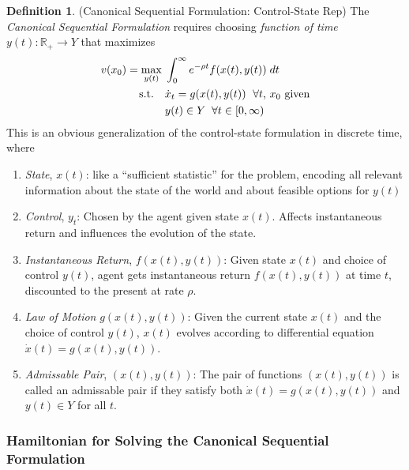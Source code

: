 \documentclass[12pt]{book}
\numberwithin{equation}{section} %
\theoremstyle{plain}
\theoremstyle{definition}
\newtheorem{defn}[thm]{Definition}
\theoremstyle{remark}
\newcommand{\ra}{\rightarrow}
\newcommand{\R}{\mathbb{R}}
\begin{document}
\begin{defn}{(Canonical Sequential Formulation: Control-State Rep)}
\label{defn:sequential-altrep-cts}
The \emph{Canonical Sequential Formulation} requires choosing
\emph{function of time} $y(t):\R_+\ra Y$ that maximizes
\begin{align}
  \label{prob:cts-dynamic}
  v(x_0)
  =
  \max_{y(t)}\;
  &\int_0^\infty e^{-\rho t} f(x(t),y(t)) \; dt
  \notag\\
  \text{s.t.}\quad
  &\text{$\dot{x}_{t} = g(x(t),y(t))$ $\;\forall t$, $x_0$ given}
  \notag\\
  &
  y(t) \in Y \;\; \forall t\in[0,\infty)
\end{align}
This is an obvious generalization of the control-state formulation in
discrete time, where
\begin{enumerate}
  \item \emph{State}, $x(t)$:
    like a ``sufficient statistic'' for the problem, encoding all
    relevant information about the state of the world and about feasible
    options for $y(t)$

  \item \emph{Control}, $y_{t}$: Chosen by the agent given state $x(t)$.
    Affects instantaneous return and influences the evolution of the
    state.

  \item \emph{Instantaneous Return}, $f(x(t),y(t))$: Given state $x(t)$ and
    choice of control $y(t)$, agent gets instantaneous return
    $f(x(t),y(t))$ at time $t$, discounted to the present at rate
    $\rho$.

  \item \emph{Law of Motion} $g(x(t),y(t))$: Given the current state $x(t)$
    and the choice of control $y(t)$,
    $x(t)$ evolves according to differential equation
    $\dot{x}(t)=g(x(t),y(t))$.
  \item \emph{Admissable Pair}, $(x(t),y(t))$: The pair of functions
    $(x(t),y(t))$ is called an admissable pair if they satisfy both
    $\dot{x}(t) = g(x(t),y(t))$ and $y(t)\in Y$ for all $t$.
\end{enumerate}
\end{defn}



\clearpage
\subsubsection{Hamiltonian for Solving the Canonical Sequential
Formulation}
\end{document}
